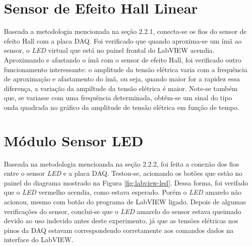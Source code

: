 \documentclass[a4paper]{instrumentacao}
\begin{document}









\section{Sensor de Efeito Hall Linear}
Baseada a metodologia mencionada na seção 2.2.1, conecta-se os fios do sensor de efeito Hall com a placa DAQ. Foi verificado que quando aproxima-se um ímã ao sensor, o \textit{LED} virtual que está no painel frontal do LabVIEW acendia. Aproximando e afastando o ímã com o sensor de efeito Hall, foi verificado outro funcionamento interessante: o amplitude da tensão elétrica varia com a frequência de aproximação e afastamento do ímã, ou seja, quando maior for a rapidez essa diferença, a variação da ampiltude
da tensão elétrica é maior. Note-se também que, se variasse com uma frequência determinada, obtêm-se um sinal do tipo onda quadrada no gráfico da amplitude de tensâo elétrica em função de tempo.

\section{Módulo Sensor LED}
Baseada na metodologia mencioanda na seção 2.2.2, foi feita a conexão dos fios  entre o sensor \textit{LED} e a placa DAQ. Testou-se, acionando os botões que estão no painel do diagrama mostrado na Figura \ref{fig:labview-led}. Dessa forma, foi verifado que o \textit{LED} vermelho acendia, como estava esperado. Porém o \textit{LED} amarelo não acionou, mesmo com botão do programa de LabVIEW ligado. Depois de algumas verificações do sensor, conclui-se que o \textit{LED} amarelo do sensor estava queimado devido ao uso indevido antes deste experimento, já que as tensões elétricas nos pinos da DAQ estavam correspondendo corretamente aos comandos dados na interface do LabVIEW.
\end{document}
